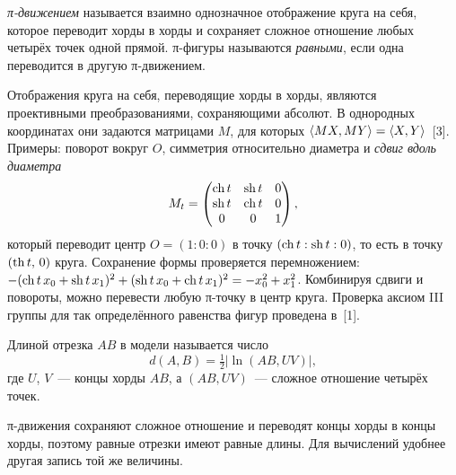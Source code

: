 \begin{definition}[\!\!{[1]}]
\emph{π-движением} называется взаимно однозначное отображение круга на себя, которое переводит хорды в хорды и сохраняет сложное отношение любых четырёх точек одной прямой. π-фигуры называются \emph{равными}, если одна переводится в другую π-движением.
\end{definition}

Отображения круга на себя, переводящие хорды в хорды, являются проективными преобразованиями, сохраняющими абсолют. В однородных координатах они задаются матрицами $M$, для которых $\langle MX,MY\rangle=\langle X,Y\rangle$~[3]. Примеры: поворот вокруг $O$, симметрия относительно диаметра и \emph{сдвиг вдоль диаметра}
\begin{equation}\label{eq:sdvig}
M_t=\begin{pmatrix}\operatorname{ch} t&\operatorname{sh} t&0\\ \operatorname{sh} t&\operatorname{ch} t&0\\ 0&0&1\end{pmatrix},
\end{equation}
который переводит центр $O=(1:0:0)$ в точку $(\operatorname{ch} t:\operatorname{sh} t:0)$, то есть в точку $(\operatorname{th} t,\,0)$ круга. Сохранение формы проверяется перемножением: $-(\operatorname{ch} t\,x_0+\operatorname{sh} t\,x_1)^2+(\operatorname{sh} t\,x_0+\operatorname{ch} t\,x_1)^2=-x_0^2+x_1^2$. Комбинируя сдвиги и повороты, можно перевести любую π-точку в центр круга. Проверка аксиом III группы для так определённого равенства фигур проведена в~[1].

\begin{definition}
Длиной отрезка $AB$ в модели называется число
\begin{equation}\label{eq:dlina}
d(A,B)=\tfrac12\bigl|\ln(AB,UV)\bigr|,
\end{equation}
где $U$, $V$~--- концы хорды $AB$, а $(AB,UV)$~--- сложное отношение четырёх точек.
\end{definition}

π-движения сохраняют сложное отношение и переводят концы хорды в концы хорды, поэтому равные отрезки имеют равные длины. Для вычислений удобнее другая запись той же величины.

